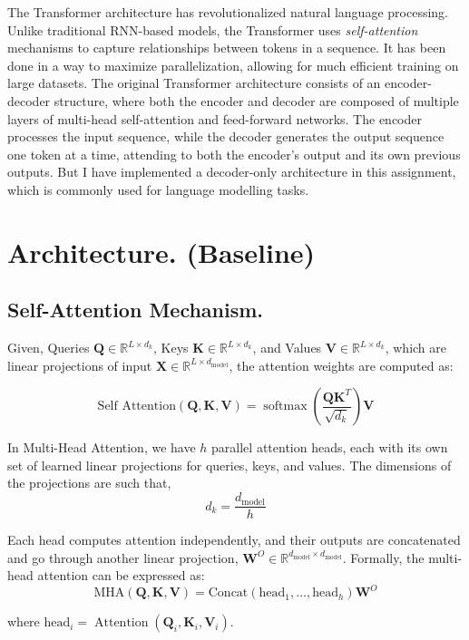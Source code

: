 \documentclass[10pt]{article}
\theoremstyle{plain}
\newcommand{\softmax}{\operatorname{softmax}}
\newcommand{\Attn}{\operatorname{Attention}}
\begin{document}
The Transformer architecture has revolutionalized natural language processing. Unlike traditional RNN-based models, the Transformer uses \emph{self-attention} mechanisms to capture relationships between tokens in a sequence. It has been done in a way to maximize parallelization, allowing for much efficient training on large datasets. The original Transformer architecture consists of an encoder-decoder structure, where both the encoder and decoder are composed of multiple layers of multi-head self-attention and feed-forward networks. The encoder processes the input sequence, while the decoder generates the output sequence one token at a time, attending to both the encoder's output and its own previous outputs. But I have implemented a decoder-only architecture in this assignment, which is commonly used for language modelling tasks. 

\section{Architecture. (Baseline)}

\subsection{Self-Attention Mechanism.}

Given, Queries \(\mathbf{Q} \in \mathbb{R}^{L \times d_k}\), Keys \(\mathbf{K} \in \mathbb{R}^{L \times d_k}\), and Values \(\mathbf{V} \in \mathbb{R}^{L \times d_k}\), which are linear projections of input \(\mathbf{X} \in \mathbb{R}^{L \times d_{\text{model}}}\), the attention weights are computed as: 

\[
    \text{Self Attention} (\mathbf{Q}, \mathbf{K}, \mathbf{V}) = \softmax(\frac{\mathbf{Q} \mathbf{K} ^T}{\sqrt{d_{k} } }) \mathbf{V}
\]

\begin{defn}
    In Multi-Head Attention, we have \(h\) parallel attention heads, each with its own set of learned linear projections for queries, keys, and values. The dimensions of the projections are such that, 
    \[
        d_k = \frac{d_{\text{model}}}{h}
    \]

    Each head computes attention independently, and their outputs are concatenated and go through another linear projection, \(\mathbf{W}^O \in \mathbb{R}^{ d_{\text{model}} \times d_{\text{model}}}\). Formally, the multi-head attention can be expressed as:
    \[
    \mathrm{MHA} (\mathbf{Q}, \mathbf{K}, \mathbf{V}) = \text{Concat}(\text{head}_1, \ldots, \text{head}_h) \mathbf{W}^O
    \]

    where \(\text{head}_i = \Attn(\mathbf{Q}_i, \mathbf{K}_{i}, \mathbf{V}_{i})\).

\end{defn}
\end{document}
